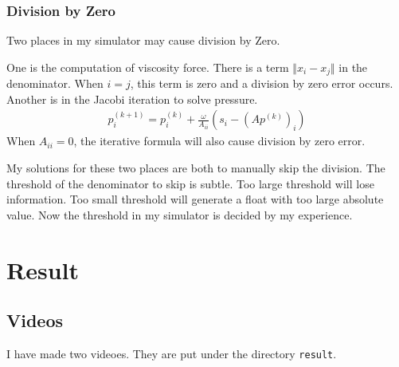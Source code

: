 \documentclass[acmlarge]{acmart}
\begin{document}

\subsubsection{Division by Zero}
Two places in my simulator may cause division by Zero.

One is the computation of 
viscosity force. There is a term $\Vert x_i-x_j\Vert$ in the denominator. When $i=j$, this term is zero and a division by zero error occurs.
Another is in the Jacobi iteration to solve pressure.
\begin{align*}
  p_i^{(k+1)}=p_i^{(k)}+\frac{\omega}{A_{ii}}(s_i-(Ap^{(k)})_i)
\end{align*}
When $A_{ii}=0$, the iterative formula will also cause division by zero error.

My solutions for these two places are both to manually skip the division. The threshold of the denominator to skip 
is subtle. Too large threshold will lose information. Too small threshold will generate a float with too large absolute value.
Now the threshold in my simulator is decided by my experience.

\section{Result}

\subsection{Videos}

I have made two videoes. They are put under the directory \texttt{result}.
\end{document}
